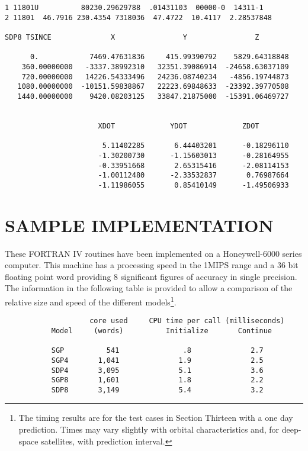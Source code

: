 \begin{verbatim}
1 11801U          80230.29629788  .01431103  00000-0  14311-1
2 11801  46.7916 230.4354 7318036  47.4722  10.4117  2.28537848

SDP8 TSINCE              X                Y                Z

      0.            7469.47631836     415.99390792    5829.64318848
    360.00000000   -3337.38992310   32351.39086914  -24658.63037109
    720.00000000   14226.54333496   24236.08740234   -4856.19744873
   1080.00000000  -10151.59838867   22223.69848633  -23392.39770508
   1440.00000000    9420.08203125   33847.21875000  -15391.06469727


                      XDOT             YDOT             ZDOT

                       5.11402285       6.44403201      -0.18296110
                      -1.30200730      -1.15603013      -0.28164955
                      -0.33951668       2.65315416      -2.08114153
                      -1.00112480      -2.33532837       0.76987664
                      -1.11986055       0.85410149      -1.49506933
\end{verbatim}

\newpage
\section[Sample Implementation]{SAMPLE IMPLEMENTATION}
These FORTRAN IV routines have been implemented on a Honeywell-6000 series
computer.  This machine has a processing speed in the 1MIPS range and a 36 bit
floating point word providing 8 significant figures of accuracy in single
precision.  The information in the following table is provided to allow a
comparison of the relative size and speed of the different models\footnote[1]%
{The timing results are for the test cases in Section Thirteen with a one day
prediction.  Times may vary slightly with orbital characteristics and, for
deep-space satellites, with prediction interval.}.
\begin{verbatim}
                    core used     CPU time per call (milliseconds)
           Model     (words)          Initialize       Continue

           SGP          541               .8              2.7
           SGP4       1,041              1.9              2.5
           SDP4       3,095              5.1              3.6
           SGP8       1,601              1.8              2.2
           SDP8       3,149              5.4              3.2
\end{verbatim}

